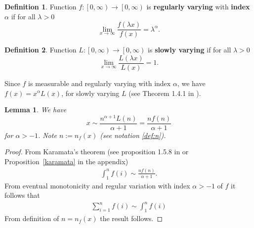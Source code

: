 \documentclass[10pt]{article}
\theoremstyle{plain}
\newtheorem{lemma}{Lemma}
\theoremstyle{definition}
\newtheorem{definition}{Definition}
\begin{document}
	\begin{definition}\label{RV_def}
		Function $f\colon\left[ 0, \infty \right)\to\left[0, \infty \right)$ is \textbf{regularly varying} with \textbf{index} $\alpha$ if for all $\lambda>0$
		\begin{equation}
			\lim_{x\to\infty}\frac{f(\lambda x)}{f(x)}=\lambda^\alpha.
		\end{equation}
	\end{definition}
	
	\begin{definition}\label{SV_def}
		Function $L\colon\left[ 0, \infty \right)\to\left[ 0, \infty \right)$ is \textbf{slowly varying} if for all $\lambda>0$
		\begin{equation}
			\lim_{x\to\infty}\frac{L(\lambda x)}{L(x)}=1.	
		\end{equation}
	\end{definition}
	
	
	
	Since $f$ is measurable and regularly varying with index $\alpha$, we have $f(x)=x^\alpha L(x)$, for slowly varying $L$ (see Theorem 1.4.1 in \cite{bingham1987regular}).
	
	\begin{lemma}\label{sum f Asymp}
		We have
		\begin{equation}
			x\sim \frac{n^{\alpha+1}L(n)}{\alpha+1}=\frac{nf(n)}{\alpha+1}
		\end{equation}
		for $\alpha>-1$. Note $n:=n_f(x)$ (see notation \ref{def:n}).
	\end{lemma}
	\begin{proof}
		From Karamata's theorem (see proposition 1.5.8 in \cite{bingham1987regular} or Proposition~\ref{karamata} in the appendix)
		\begin{align}
			\int_{1}^{n} f(i)\sim \frac{nf(n)}{\alpha+1}.
		\end{align}
		From eventual monotonicity and regular variation with index $\alpha>-1$ of $f$ it follows that
		\begin{align}
			\sum_{i=1}^{n} f(i)\sim\int_{1}^{n} f(i)
		\end{align}
		From definition of $n=n_f(x)$ the result follows.
	\end{proof}
	
	
	
	
	
	
	
	
	
	
	
	
	
\end{document}
